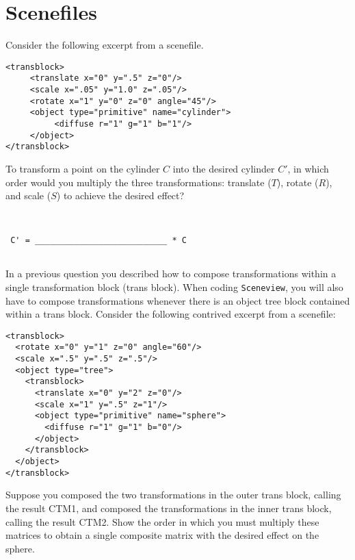 \documentclass[10pt,twocolumn]{article}
\begin{document}
\section{Scenefiles}
Consider the following excerpt from a scenefile.
\begin{verbatim}
<transblock>
     <translate x="0" y=".5" z="0"/>
     <scale x=".05" y="1.0" z=".05"/>
     <rotate x="1" y="0" z="0" angle="45"/>
     <object type="primitive" name="cylinder">
          <diffuse r="1" g="1" b="1"/> 
     </object>
</transblock>
\end{verbatim}

\begin{framed}
  To transform a point on the cylinder $C$ into the desired cylinder $C'$, in which order would you multiply the three transformations: translate ($T$), rotate ($R$), and scale ($S$) to achieve the desired effect?\\
\begin{verbatim}


 C' = ___________________________ * C
 
\end{verbatim} 
\end{framed}

\noindent In a previous question you described how to compose transformations within a single transformation block (trans block). When coding {\tt Sceneview}, you will also have to compose transformations whenever there is an object tree block contained within a trans block. Consider the following contrived excerpt from a scenefile:
\begin{verbatim}
<transblock>
  <rotate x="0" y="1" z="0" angle="60"/> 
  <scale x=".5" y=".5" z=".5"/>
  <object type="tree">
    <transblock>
      <translate x="0" y="2" z="0"/>
      <scale x="1" y=".5" z="1"/>
      <object type="primitive" name="sphere">
        <diffuse r="1" g="1" b="0"/> 
      </object>
    </transblock> 
  </object>
</transblock>
\end{verbatim}

\begin{framed}
  Suppose you composed the two transformations in the outer trans block, calling the result CTM1, and composed the transformations in the inner trans block, calling the result CTM2. Show the order in which you must multiply these matrices to obtain a single composite matrix with the desired effect on the sphere.
\end{framed}
\end{document}
